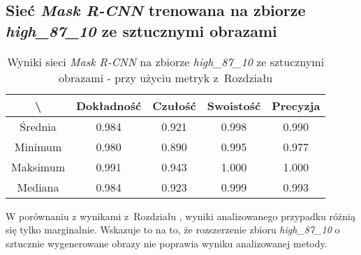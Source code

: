 \subsection{Sieć \textit{Mask R-CNN} trenowana na zbiorze \textit{high\_87\_10} ze sztucznymi obrazami}
\label{sec:results_high_original_generated}

\begin{table}[H]
	\centering
	\caption{Wyniki sieci \textit{Mask R-CNN} na zbiorze \textit{high\_87\_10} ze sztucznymi obrazami - przy użyciu metryk z~Rozdziału }
	\vspace{6pt}
	{\footnotesize
		\begin{tabular}{|c|c|c|c|c|}
      \hline \textbackslash & Dokładność & Czułość & Swoistość & Precyzja \\
      \hline Średnia & 0.984 & 0.921 & 0.998 & 0.990 \\
      \hline Minimum & 0.980 & 0.890 & 0.995 & 0.977 \\
      \hline Maksimum & 0.991 & 0.943 & 1.000 & 1.000 \\
      \hline Mediana & 0.984 & 0.923 & 0.999 & 0.993 \\
      \hline
		\end{tabular}
	}
  \vspace{0pt}
  \label{Tab:high_original_generated_calculated}
\end{table}

W porównaniu z wynikami z~Rozdziału , wyniki analizowanego przypadku różnią się tylko marginalnie. Wskazuje to na to, że rozszerzenie zbioru \textit{high\_87\_10} o sztucznie wygenerowane obrazy nie poprawia wyniku analizowanej metody.
